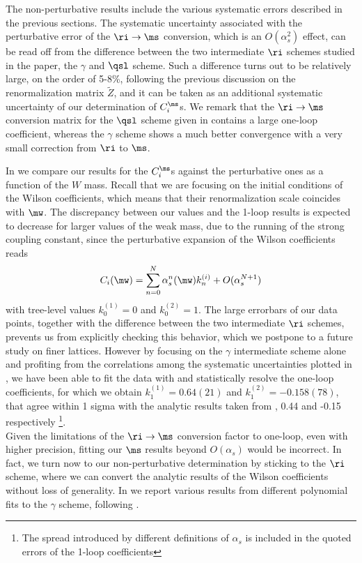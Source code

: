 \documentclass[aps,prd,twocolumn,nofootinbib,showpacs,superscriptaddress]{revtex4-1}
\begin{document}
The non-perturbative results include the various systematic errors described
in the previous sections. The systematic uncertainty associated with the
perturbative error of the $\ri \to \ms$ conversion, which is an $O(\alpha_s^2)$ effect,
can be read off from the difference between
the two intermediate $\ri$ schemes studied in the paper, the $\gamma$ and $\qsl$ scheme.
Such a difference turns out to be relatively large, on the order of 5-8\%, 
following the previous discussion on the renormalization matrix $\tilde Z$, 
and it can be taken as an additional systematic uncertainty of our determination
of $C_i^\ms$s.
We remark that the $\ri \to \ms$ conversion matrix for the 
$\qsl$ scheme given in  contains a large one-loop coefficient,
whereas the $\gamma$ scheme shows a much better convergence with a very small correction
from $\ri$ to $\ms$.

In  we compare our results for the $C_i^\ms$s against the perturbative
ones as a function of the $W$ mass. Recall that we are focusing on the initial conditions of
the Wilson coefficients, which means that their renormalization scale coincides with $\mw$.
The discrepancy between our values and the 1-loop results
is expected to decrease for larger values of
the weak mass, due to the running of the strong coupling constant,
since the perturbative expansion of the Wilson coefficients reads
\begin{equation}
C_i(\mw) = \sum_{n=0}^N \alpha_s^n (\mw) k^{(i)}_n + O(\alpha_s^{N+1})
\label{eq:wcoeff_pert}
\end{equation}
with tree-level values $k_0^{(1)}=0$ and $k_0^{(2)}=1$.
The large errorbars of our data points, together with the difference
between the two intermediate $\ri$ schemes, prevents
us from explicitly checking this behavior, which we 
postpone to a future study on finer lattices.
However by focusing on the $\gamma$ intermediate scheme alone
and profiting from the correlations among the systematic uncertainties 
plotted in , 
we have been able to fit the data with
 and statistically resolve the one-loop coefficients,
for which we obtain $k_1^{(1)}=0.64(21)$ and $k_1^{(2)}=-0.158(78)$, 
that agree within 1 sigma
with the analytic results taken from , 0.44 and -0.15
respectively
\footnote{The spread introduced by different definitions
of $\alpha_s$ is included in the quoted errors of the
1-loop coefficients}.\\

Given the limitations of the $\ri \to \ms$ conversion factor to one-loop, even with higher
precision, fitting our $\ms$ results beyond $O(\alpha_s)$ would be incorrect.
In fact, we turn now to our non-perturbative determination by sticking to the 
$\ri$ scheme, where we can convert the analytic results of the Wilson coefficients
without loss of generality.
In  we report various results from different polynomial fits to the 
$\gamma$ scheme, following . 
\end{document}
